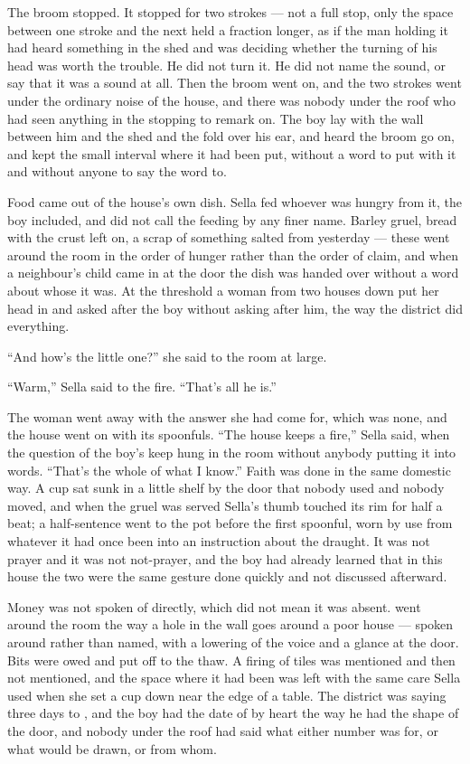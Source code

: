 The broom stopped. It stopped for two strokes --- not a full stop, only the space between one stroke and the next held a fraction longer, as if the man holding it had heard something in the shed and was deciding whether the turning of his head was worth the trouble. He did not turn it. He did not name the sound, or say that it was a sound at all. Then the broom went on, and the two strokes went under the ordinary noise of the house, and there was nobody under the roof who had seen anything in the stopping to remark on. The boy lay with the wall between him and the shed and the fold over his ear, and heard the broom go on, and kept the small interval where it had been put, without a word to put with it and without anyone to say the word to.

\scenebreak

Food came out of the house's own dish. Sella fed whoever was hungry from it, the boy included, and did not call the feeding by any finer name. Barley gruel, bread with the crust left on, a scrap of something salted from yesterday --- these went around the room in the order of hunger rather than the order of claim, and when a neighbour's child came in at the door the dish was handed over without a word about whose it was. At the threshold a woman from two houses down put her head in and asked after the boy without asking after him, the way the district did everything.

“And how's the little one?” she said to the room at large.

“Warm,” Sella said to the fire. “That's all he is.”

The woman went away with the answer she had come for, which was none, and the house went on with its spoonfuls. “The house keeps a fire,” Sella said, when the question of the boy's keep hung in the room without anybody putting it into words. “That's the whole of what I know.” Faith was done in the same domestic way. A cup sat sunk in a little shelf by the door that nobody used and nobody moved, and when the gruel was served Sella's thumb touched its rim for half a beat; a half-sentence went to the pot before the first spoonful, worn by use from whatever it had once been into an instruction about the draught. It was not prayer and it was not not-prayer, and the boy had already learned that in this house the two were the same gesture done quickly and not discussed afterward.

Money was not spoken of directly, which did not mean it was absent.  went around the room the way a hole in the wall goes around a poor house --- spoken around rather than named, with a lowering of the voice and a glance at the door. Bits were owed and put off to the thaw. A firing of tiles was mentioned and then not mentioned, and the space where it had been was left with the same care Sella used when she set a cup down near the edge of a table. The district was saying three days to , and the boy had the date of  by heart the way he had the shape of the door, and nobody under the roof had said what either number was for, or what would be drawn, or from whom.

